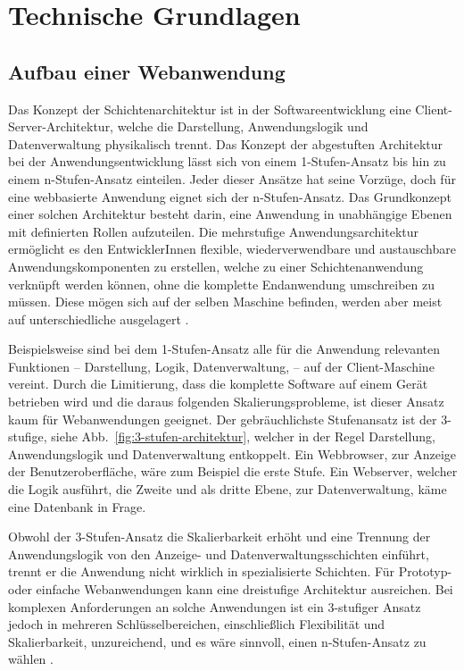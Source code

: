 \chapter{Technische Grundlagen}

\section{Aufbau einer Webanwendung}
\label{cha:webapplication_structure}

Das Konzept der Schichtenarchitektur ist in der Softwareentwicklung eine Client-Server-Architektur, welche die Darstellung, Anwendungslogik und Datenverwaltung physikalisch trennt.  
Das Konzept der abgestuften Architektur bei der Anwendungsentwicklung lässt sich von einem 1-Stufen-Ansatz bis hin zu einem n-Stufen-Ansatz einteilen. Jeder dieser Ansätze hat seine Vorzüge, doch für eine webbasierte Anwendung eignet sich der n-Stufen-Ansatz. Das Grundkonzept einer solchen Architektur besteht darin, eine Anwendung in unabhängige Ebenen mit definierten Rollen aufzuteilen.
Die mehrstufige Anwendungsarchitektur ermöglicht es den EntwicklerInnen flexible, wiederverwendbare und austauschbare  Anwendungskomponenten zu erstellen, welche zu einer Schichtenanwendung verknüpft werden können, ohne die komplette Endanwendung umschreiben zu müssen.
Diese mögen sich auf der selben Maschine befinden, werden aber meist auf unterschiedliche ausgelagert \cite{wiki-ntier-architecture}.

Beispielsweise sind bei dem 1-Stufen-Ansatz alle für die Anwendung relevanten Funktionen -- Darstellung, Logik, Datenverwaltung, \etc -- auf der Client-Maschine vereint. Durch die Limitierung, dass die komplette Software auf einem Gerät betrieben wird und die daraus folgenden Skalierungsprobleme, ist dieser Ansatz kaum für Webanwendungen geeignet.
Der gebräuchlichste Stufenansatz ist der 3-stufige, siehe Abb.~\ref{fig:3-stufen-architektur}, welcher in der Regel Darstellung, Anwendungslogik und Datenverwaltung entkoppelt. Ein Webbrowser, zur Anzeige der Benutzeroberfläche, wäre zum Beispiel die erste Stufe. Ein Webserver, welcher die Logik ausführt, die Zweite und als dritte Ebene, zur Datenverwaltung, käme eine Datenbank in Frage. 

Obwohl der 3-Stufen-Ansatz die Skalierbarkeit erhöht und eine Trennung der Anwendungslogik von den Anzeige- und Datenverwaltungsschichten einführt, trennt er die Anwendung nicht wirklich in spezialisierte Schichten. Für Prototyp- oder einfache Webanwendungen kann eine dreistufige Architektur ausreichen. Bei komplexen Anforderungen an solche Anwendungen ist ein 3-stufiger Ansatz jedoch in mehreren Schlüsselbereichen, einschließlich Flexibilität und Skalierbarkeit, unzureichend, und es wäre sinnvoll, einen n-Stufen-Ansatz zu wählen \cite{nTier-architecture}.

